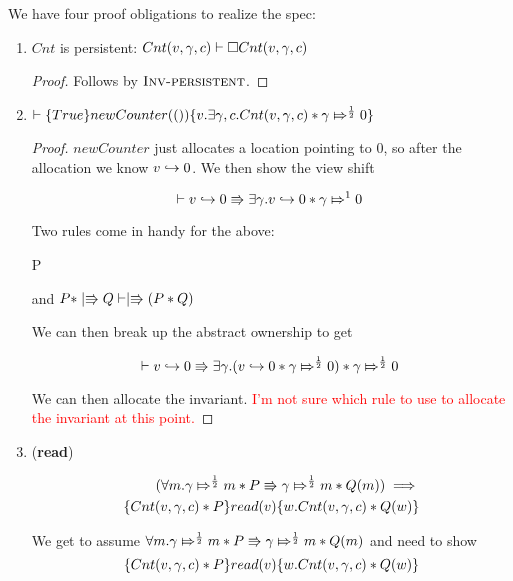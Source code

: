 We have four proof obligations to realize the spec:
\begin{enumerate}

\item $Cnt$ is persistent: $\Cnt{v}{\gamma}{c} \vdash \pemod{\Cnt{v}{\gamma}{c}}$

\begin{proof}
Follows by $\textsc{Inv-persistent}$.
\end{proof}

\item $ \vdash \hot{True}{ newCounter(())}{v. \exists \gamma, c. \Cnt{v}{\gamma}{c} * \apointsto{\gamma}{0}{\frac{1}{2}}}$

\begin{proof}
$newCounter$ just allocates a location pointing to $0$, so after the allocation we know $\pointsto{v}{0}$.  We then show the view shift

\[
\vdash \vshift{\pointsto{v}{0}}{\exists \gamma. \pointsto{v}{0} * \apointsto{\gamma}{0}{1}}\
\]

Two rules come in handy for the above:

\infrule
  {\vdash P \implies {}}
  {\vdash {}}

and $P * \upmod{Q}  \vdash \upmod{(P * Q)}$

We can then break up the abstract ownership to get

\[
\vdash \vshift{\pointsto{v}{0}}{\exists \gamma. (\pointsto{v}{0} * \apointsto{\gamma}{0}{\frac{1}{2}}) * \apointsto{\gamma}{0}{\frac{1}{2}}}\
\]

We can then allocate the invariant. \textcolor{red}{I'm not sure which rule to use to allocate the invariant at this point.}

\end{proof}

\item  (\textbf{read})

\begin{align*}
(\forall m. \apointsto{\gamma}{m}{\frac{1}{2}} * P \Rrightarrow \apointsto{\gamma}{m}{\frac{1}{2}} * Q(m) ) \implies\\
 \hot{\Cnt{v}{\gamma}{c} * P}{read(v)}{w. \Cnt{v}{\gamma}{c} * Q(w)}
\end{align*}

We get to assume $\forall m. \apointsto{\gamma}{m}{\frac{1}{2}} * P \Rrightarrow \apointsto{\gamma}{m}{\frac{1}{2}} * Q(m) $ and need to show
\[ \hot{\Cnt{v}{\gamma}{c} * P}{read(v)}{w. \Cnt{v}{\gamma}{c} * Q(w)} \]


\end{enumerate}
